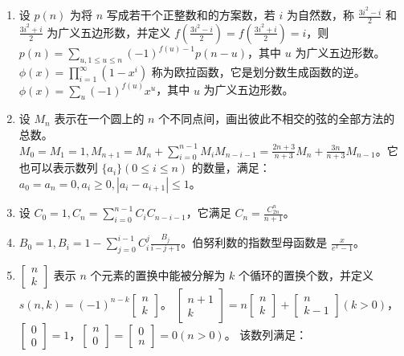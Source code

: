 \begin{enumerate}

\item 设 $p(n)$ 为将 $n$ 写成若干个正整数和的方案数，若 $i$ 为自然数，称 $\frac{3i^{2}-i}{2}$ 和 $\frac{3i^{2}+i}{2}$ 为广义五边形数，并定义 $f(\frac{3i^{2}-i}{2}) = f(\frac{3i^{2}+i}{2}) = i$，则 $p(n) = \sum_{u,1 \le u \le n}(-1)^{f(u) - 1}p(n-u)$，其中 $u$ 为广义五边形数。$\displaystyle{\phi(x)=\prod_{i=1}^{\infty}(1-x^{i})}$ 称为欧拉函数，它是划分数生成函数的逆。$\phi(x) = \sum_{u}(-1)^{f(u)}x^{u}$，其中 $u$ 为广义五边形数。

\item 设 $M_{n}$ 表示在一个圆上的 $n$ 个不同点间，画出彼此不相交的弦的全部方法的总数。$M_{0} = M_{1} = 1, M_{n + 1} = M_{n}+\sum_{i=0}^{n-1}M_{i}M_{n-i-1} = \frac{2n+3}{n+3}M_{n}+\frac{3n}{n+3}M_{n-1}$。它也可以表示数列 $\{a_{i}\}(0 \le i \le n)$ 的数量，满足：$a_{0} = a_{n} = 0, a_{i} \ge 0, |a_{i}-a_{i + 1}| \le 1$。

\item 设 $C_{0}=1,C_{n}=\sum_{i=0}^{n-1}C_{i}C_{n-i-1}$，它满足 $\displaystyle{C_{n} = \frac{C_{2n}^{n}}{n+1}}$。

\item $B_{0} = 1, B_{i}=1-\sum_{j = 0}^{i-1}C_{i}^{j}\frac{B_{j}}{i-j+1}$。伯努利数的指数型母函数是 $\frac{x}{e^{x}-1}$。

\item $\begin{bmatrix}n\\k\end{bmatrix}$ 表示 $n$ 个元素的置换中能被分解为 $k$ 个循环的置换个数，并定义 $s(n,k)=(-1)^{n-k}\begin{bmatrix}n\\k\end{bmatrix}$。 $\begin{bmatrix}n+1\\k\end{bmatrix}=n\begin{bmatrix}n\\k\end{bmatrix}+\begin{bmatrix}n\\k-1\end{bmatrix}(k>0)$，$\begin{bmatrix}0\\0\end{bmatrix}=1$，$\begin{bmatrix}n\\0\end{bmatrix}=\begin{bmatrix}0\\n\end{bmatrix}=0(n>0)$。
该数列满足：


\end{enumerate}
